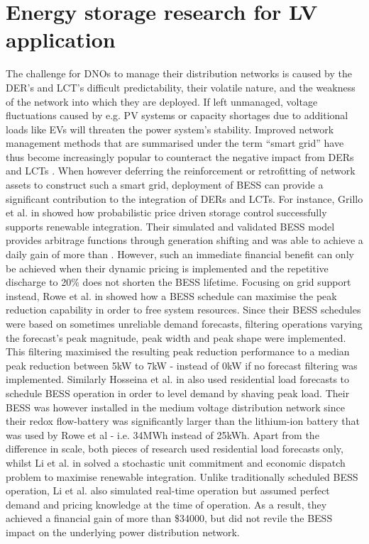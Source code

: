 \section{Energy storage research for LV application}
\label{ch-literature:sec:energy-storage}

The challenge for DNOs to manage their distribution networks is caused by the DER's and LCT's difficult predictability, their volatile nature, and the weakness of the network into which they are deployed.
If left unmanaged, voltage fluctuations caused by e.g. PV systems \cite{Woyte2006, Bravo2015} or capacity shortages due to additional loads like EVs \cite{Mohd2008a, Koureoumpezis2010} will threaten the power system's stability.
Improved network management methods that are summarised under the term ``smart grid'' have thus become increasingly popular to counteract the negative impact from DERs and LCTs \cite{Panteli2015}.
When however deferring the reinforcement or retrofitting of network assets to construct such a smart grid, deployment of BESS can provide a significant contribution to the integration of DERs and LCTs.
For instance, Grillo et al. in \cite{Grillo2012} showed how probabilistic price driven storage control successfully supports renewable integration.
Their simulated and validated BESS model provides arbitrage functions through generation shifting and was able to achieve a daily gain of more than .
However, such an immediate financial benefit can only be achieved when their dynamic pricing is implemented and the repetitive discharge to 20\% does not shorten the BESS lifetime.
Focusing on grid support instead, Rowe et al. in \cite{Rowe2014a} showed how a BESS schedule can maximise the peak reduction capability in order to free system resources.
Since their BESS schedules were based on sometimes unreliable demand forecasts, filtering operations varying the forecast's peak magnitude, peak width and peak shape were implemented.
This filtering maximised the resulting peak reduction performance to a median peak reduction between 5kW to 7kW - instead of 0kW if no forecast filtering was implemented.
Similarly Hosseina et al. in \cite{Hosseina2016a} also used residential load forecasts to schedule BESS operation in order to level demand by shaving peak load.
Their BESS was however installed in the medium voltage distribution network since their redox flow-battery was significantly larger than the lithium-ion battery that was used by Rowe et al - i.e. 34MWh instead of 25kWh.
Apart from the difference in scale, both pieces of research used residential load forecasts only, whilst Li et al. in \cite{Li2016} solved a stochastic unit commitment and economic dispatch problem to maximise renewable integration.
Unlike traditionally scheduled BESS operation, Li et al. also simulated real-time operation but assumed perfect demand and pricing knowledge at the time of operation.
As a result, they achieved a financial gain of more than \$34000, but did not revile the BESS impact on the underlying power distribution network.

